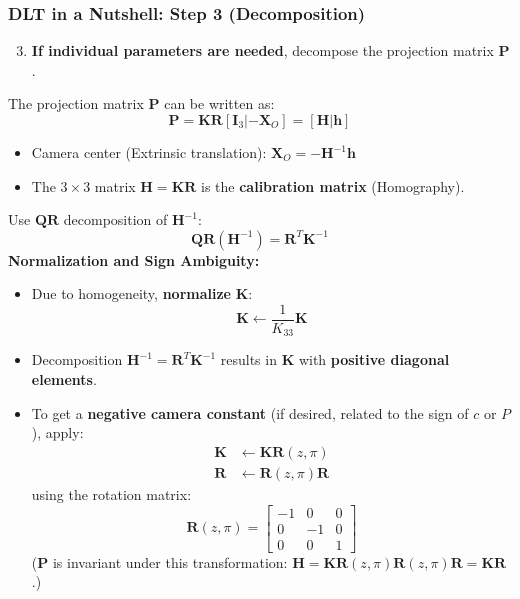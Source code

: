 \begin{frame}
  \frametitle{DLT in a Nutshell: Step 3 (Decomposition)}
    \begin{enumerate}
        \setcounter{enumi}{2}
        \item \textbf{If individual parameters are needed}, decompose the projection matrix $\mathbf{P}$.
    \end{enumerate}
    \vspace{0.5cm}
    The projection matrix $\mathbf{P}$ can be written as:
    $$
    \mathbf{P} = \mathbf{K} \mathbf{R} [\mathbf{I}_3 | - \mathbf{X}_O] = [\mathbf{H} | \mathbf{h}]
    $$
    \begin{itemize}
        \item Camera center (Extrinsic translation): $\mathbf{X}_O = -\mathbf{H}^{-1} \mathbf{h}$
        \item The $3 \times 3$ matrix $\mathbf{H} = \mathbf{K} \mathbf{R}$ is the \textbf{calibration matrix} (Homography).
    \end{itemize}
    \vspace{0.5cm}
    Use $\mathbf{Q R}$ decomposition of $\mathbf{H}^{-1}$:
    $$
    \mathbf{Q R}(\mathbf{H}^{-1}) = \mathbf{R}^T \mathbf{K}^{-1}
    $$
    \vspace{0.5cm}
    \textbf{Normalization and Sign Ambiguity:}
    \begin{itemize}
        \item Due to homogeneity, \textbf{normalize} $\mathbf{K}$:
        $$
        \mathbf{K} \leftarrow \frac{1}{K_{33}} \mathbf{K}
        $$
        \item Decomposition $\mathbf{H}^{-1} = \mathbf{R}^T \mathbf{K}^{-1}$ results in $\mathbf{K}$ with \textbf{positive diagonal elements}.
        \item To get a \textbf{negative camera constant} (if desired, related to the sign of $c$ or $P$), apply:
        \begin{align*}
            \mathbf{K} &\leftarrow \mathbf{K} \mathbf{R}(z, \pi) \\
            \mathbf{R} &\leftarrow \mathbf{R}(z, \pi) \mathbf{R}
        \end{align*}
        using the rotation matrix:
        $$
        \mathbf{R}(z, \pi) = \begin{bmatrix}
            -1 & 0 & 0 \\
            0 & -1 & 0 \\
            0 & 0 & 1
        \end{bmatrix}
        $$
        \footnotesize{($\mathbf{P}$ is invariant under this transformation: $\mathbf{H} = \mathbf{K} \mathbf{R}(z, \pi) \mathbf{R}(z, \pi) \mathbf{R} = \mathbf{K} \mathbf{R}$.)}
    \end{itemize}
\end{frame}

